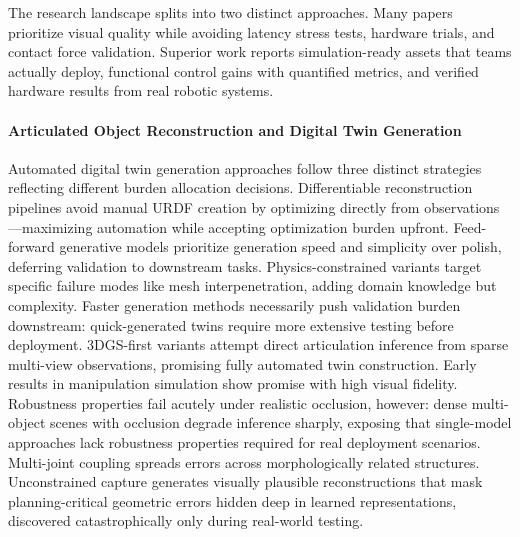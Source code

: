﻿\documentclass[11pt,a4paper]{article}
\begin{document}
The research landscape splits into two distinct approaches. Many papers prioritize visual quality while avoiding latency stress tests, hardware trials, and contact force validation. Superior work reports simulation-ready assets that teams actually deploy, functional control gains with quantified metrics, and verified hardware results from real robotic systems.

\paragraph{Articulated Object Reconstruction and Digital Twin Generation}
Automated digital twin generation approaches follow three distinct strategies reflecting different burden allocation decisions. Differentiable reconstruction pipelines avoid manual URDF creation by optimizing directly from observations—maximizing automation while accepting optimization burden upfront. Feed-forward generative models prioritize generation speed and simplicity over polish, deferring validation to downstream tasks. Physics-constrained variants target specific failure modes like mesh interpenetration, adding domain knowledge but complexity. Faster generation methods necessarily push validation burden downstream: quick-generated twins require more extensive testing before deployment. 3DGS-first variants attempt direct articulation inference from sparse multi-view observations, promising fully automated twin construction. Early results in manipulation simulation show promise with high visual fidelity. Robustness properties fail acutely under realistic occlusion, however: dense multi-object scenes with occlusion degrade inference sharply, exposing that single-model approaches lack robustness properties required for real deployment scenarios. Multi-joint coupling spreads errors across morphologically related structures. Unconstrained capture generates visually plausible reconstructions that mask planning-critical geometric errors hidden deep in learned representations, discovered catastrophically only during real-world testing.
\end{document}
